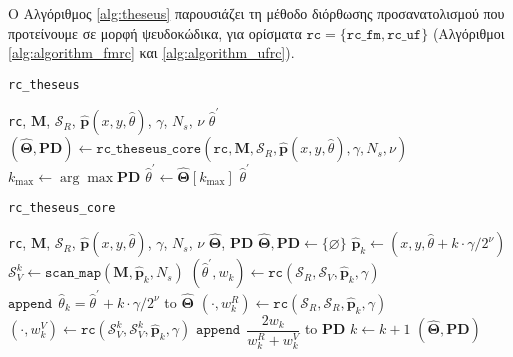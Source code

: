 Ο Αλγόριθμος \ref{alg:theseus} παρουσιάζει τη μέθοδο διόρθωσης προσανατολισμού
που προτείνουμε σε μορφή ψευδοκώδικα, για ορίσματα $\texttt{rc} =
\{\texttt{rc\_fm}, \texttt{rc\_uf}\}$ (Αλγόριθμοι \ref{alg:algorithm_fmrc} και
\ref{alg:algorithm_ufrc}).

\begin{algorithm}[!h]
  \caption{\texttt{rc\_theseus}}
  \label{alg:theseus}
  \begin{spacing}{1.5}
  \begin{algorithmic}[1]
    \REQUIRE \texttt{rc}, $\bm{M}$, $\mathcal{S}_R$, $\hat{\bm{p}}(x, y, \hat{\theta})$, $\gamma$, $N_s$, $\nu$
    \ENSURE $\hat{\theta}^\prime$
    \STATE $(\hat{\bm{\Theta}}, \textbf{PD}) \leftarrow \texttt{rc\_theseus\_core}(\texttt{rc}, \bm{M}, \mathcal{S}_R, \hat{\bm{p}}(x, y, \hat{\theta}), \gamma, N_s, \nu)$
    \STATE $k_{\max} \leftarrow \arg\max\textbf{PD}$
    \STATE $\hat{\theta}^\prime \leftarrow \hat{\bm{\Theta}}[k_{\max}]$
    \RETURN $\hat{\theta}^\prime$
  \end{algorithmic}
  \end{spacing}
\end{algorithm}

\begin{algorithm}[!h]
  \caption{\texttt{rc\_theseus\_core}}
  \label{alg:core_theseus}
  \begin{spacing}{1.5}
  \begin{algorithmic}[1]
    \REQUIRE \texttt{rc}, $\bm{M}$, $\mathcal{S}_R$, $\hat{\bm{p}}(x, y, \hat{\theta})$, $\gamma$, $N_s$, $\nu$
    \ENSURE $\hat{\bm{\Theta}}$, $\textbf{PD}$
    \STATE $\hat{\bm{\Theta}}, \textbf{PD} \leftarrow \{\varnothing\}$
      \STATE $\hat{\bm{p}}_k \leftarrow (x, y, \hat{\theta} + k \cdot \gamma/2^\nu)$
      \STATE $\mathcal{S}_V^k \leftarrow \texttt{scan\_map}(\bm{M}, \hat{\bm{p}}_k, N_s)$
      \STATE $(\hat{\theta}^\prime, w_k) \leftarrow \texttt{rc}(\mathcal{S}_R, \mathcal{S}_V, \hat{\bm{p}}_k, \gamma)$
      \STATE $\texttt{append} \ \ \hat{\theta}_k = \hat{\theta}^\prime + k \cdot \gamma/2^\nu$ to $\hat{\bm{\Theta}}$
      \STATE $(\cdot,w_k^{R}) \leftarrow \texttt{rc}(\mathcal{S}_R, \mathcal{S}_R, \hat{\bm{p}}_k, \gamma)$
      \STATE $(\cdot,w_k^{V}) \leftarrow \texttt{rc}(\mathcal{S}_V^k, \mathcal{S}_V^k, \hat{\bm{p}}_k, \gamma)$
      \STATE $\texttt{append} \ \ \dfrac{2w_k}{w_k^{R} + w_k^{V}}$ to \textbf{PD}
      \STATE $k \leftarrow k + 1$
    \ENDFOR
    \RETURN $(\hat{\bm{\Theta}}, \textbf{PD})$
  \end{algorithmic}
  \end{spacing}
\end{algorithm}

